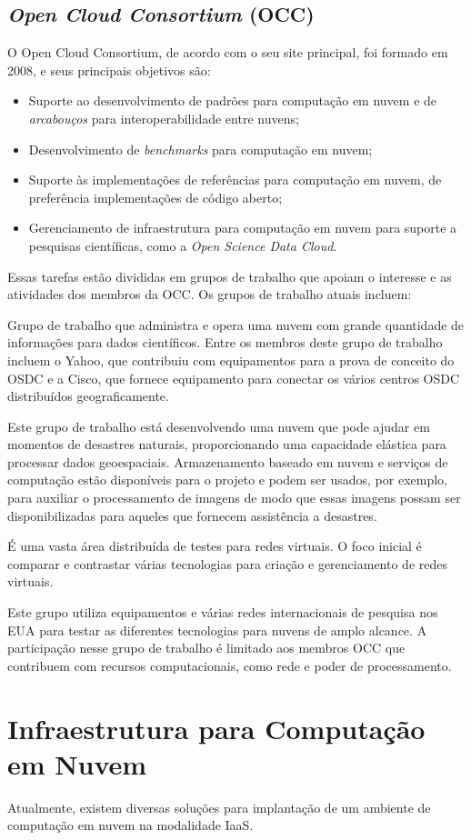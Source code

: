 \subsection{\textit{Open Cloud Consortium} (OCC)}
\label{computacaoemnuvem:padronizacoes:occ}

O Open Cloud Consortium, de acordo com o seu site principal, foi formado em
2008, e seus principais objetivos são:

\begin{itemize}
\item Suporte ao desenvolvimento de padrões para computação em nuvem e de
\textit{arcabouços} para interoperabilidade entre nuvens;
\item Desenvolvimento de \textit{benchmarks} para computação em nuvem;
\item Suporte às implementações de referências para computação em nuvem, de
preferência implementações de código aberto;
\item Gerenciamento de infraestrutura para computação em nuvem para suporte a
pesquisas científicas, como a \textit{Open Science Data Cloud}.
\end{itemize}
Essas tarefas estão divididas em grupos de trabalho que apoiam o interesse e as
atividades dos membros da OCC. Os grupos de trabalho atuais incluem:

\begin{description}
\setlength{\itemsep}{1pt}
\setlength{\parskip}{0pt}
\setlength{\parsep}{0pt}
\item[\textit{The Open Science Data Cloud (OSDC)} -] Grupo de trabalho que
administra e opera uma nuvem com grande quantidade de informações para dados
científicos. Entre os membros deste grupo de trabalho incluem o Yahoo, que
contribuiu com equipamentos para a prova de conceito do OSDC e a Cisco, que
fornece equipamento para conectar os vários centros OSDC distribuídos
geograficamente.

\item[\textit{Projeto Matsu} -] Este grupo de trabalho está desenvolvendo uma
nuvem que pode ajudar em momentos de desastres naturais, proporcionando uma
capacidade elástica para processar dados geoespaciais. Armazenamento baseado em
nuvem e serviços de computação estão disponíveis para o projeto e podem ser
usados, por exemplo, para auxiliar o processamento de imagens de modo que essas
imagens possam ser disponibilizadas para aqueles que fornecem assistência a
desastres.

\item[\textit{OCC Virtual Network Testbed} -] É uma vasta área distribuída de
testes para redes virtuais. O foco inicial é comparar e contrastar várias
tecnologias para criação e gerenciamento de redes virtuais.

\item[\textit{The Open Cloud Testbed} -] Este grupo utiliza equipamentos e
várias redes internacionais de pesquisa nos EUA para testar as diferentes
tecnologias para nuvens de amplo alcance. A participação nesse grupo de trabalho
é limitado aos membros OCC que contribuem com recursos computacionais, como rede
e poder de processamento.
\end{description}

\section{Infraestrutura para Computação em Nuvem}
\label{computacaoemnuvem:infraestrutura}
Atualmente, existem diversas soluções para implantação de um ambiente de
computação em nuvem na modalidade IaaS.